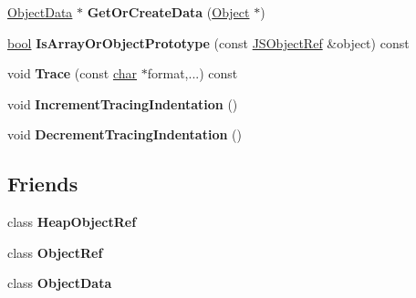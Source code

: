 \begin{DoxyCompactItemize}
\mbox{\hyperlink{classv8_1_1internal_1_1compiler_1_1ObjectData}{Object\+Data}} $\ast$ {\bfseries Get\+Or\+Create\+Data} (\mbox{\hyperlink{classv8_1_1internal_1_1Object}{Object}} $\ast$)
\item 
\mbox{\label{classv8_1_1internal_1_1compiler_1_1JSHeapBroker_a7165f12789e415a5edfb7ea3f15c6bb4}} 
\mbox{\hyperlink{classbool}{bool}} {\bfseries Is\+Array\+Or\+Object\+Prototype} (const \mbox{\hyperlink{classv8_1_1internal_1_1compiler_1_1JSObjectRef}{J\+S\+Object\+Ref}} \&object) const
\item 
\mbox{\label{classv8_1_1internal_1_1compiler_1_1JSHeapBroker_aedd03309992d341173065aa831bc8438}} 
void {\bfseries Trace} (const \mbox{\hyperlink{classchar}{char}} $\ast$format,...) const
\item 
\mbox{\label{classv8_1_1internal_1_1compiler_1_1JSHeapBroker_a8da2efbe37d28dd007a5e6b747fd26eb}} 
void {\bfseries Increment\+Tracing\+Indentation} ()
\item 
\mbox{\label{classv8_1_1internal_1_1compiler_1_1JSHeapBroker_ae165728e3b2bff19e302e7a8a9f48188}} 
void {\bfseries Decrement\+Tracing\+Indentation} ()
\end{DoxyCompactItemize}
\subsection*{Friends}
\begin{DoxyCompactItemize}
\item 
\mbox{\label{classv8_1_1internal_1_1compiler_1_1JSHeapBroker_afb019aaea10a033de304d8382e0db3b9}} 
class {\bfseries Heap\+Object\+Ref}
\item 
\mbox{\label{classv8_1_1internal_1_1compiler_1_1JSHeapBroker_a5d7d1b555fd908e511caa42bd7ccfc71}} 
class {\bfseries Object\+Ref}
\item 
\mbox{\label{classv8_1_1internal_1_1compiler_1_1JSHeapBroker_a5e510a0f60c0bbbc00262d15d787892b}} 
class {\bfseries Object\+Data}
\end{DoxyCompactItemize}



